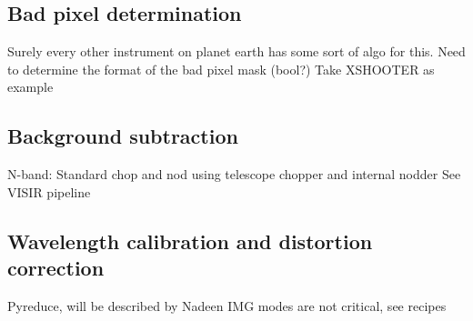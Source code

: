 \subsection{Bad pixel determination}\label{ssec:criticalbadpixeldetermination}

Surely every other instrument on planet earth has some sort of algo for this.
Need to determine the format of the bad pixel mask (bool?)
Take XSHOOTER as example

\subsection{Background subtraction}\label{ssec:criticalbackgroundsubtraction}

N-band: Standard chop and nod using telescope chopper and internal nodder
See VISIR pipeline

\subsection{Wavelength calibration and distortion correction}\label{ssec:criticalwavelengthanddistortion}

Pyreduce, will be described by Nadeen
IMG modes are not critical, see recipes

